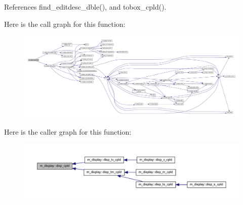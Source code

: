 References find\+\_\+editdesc\+\_\+dble(), and tobox\+\_\+cpld().

Here is the call graph for this function\+:
\nopagebreak
\begin{figure}[H]
\begin{center}
\leavevmode
\includegraphics[width=350pt]{namespacem__display_a331e5caf7f78cff8f7e19145001bcdca_cgraph}
\end{center}
\end{figure}
Here is the caller graph for this function\+:
\nopagebreak
\begin{figure}[H]
\begin{center}
\leavevmode
\includegraphics[width=350pt]{namespacem__display_a331e5caf7f78cff8f7e19145001bcdca_icgraph}
\end{center}
\end{figure}
\mbox{\label{namespacem__display_ae6588ffe4d1d6d1022c0b0017f4f70b7}} 
